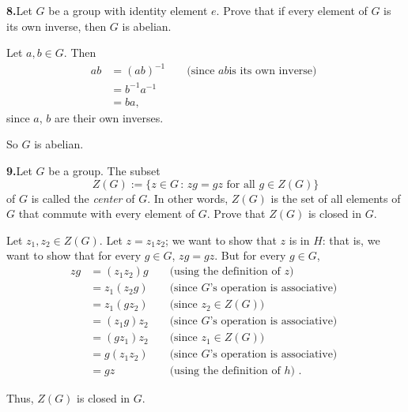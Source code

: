 \documentclass[10pt,]{book}
\theoremstyle{plain}
\theoremstyle{definition}
\theoremstyle{definition}
\theoremstyle{definition}
\theoremstyle{definition}
\numberwithin{equation}{section}
\newcommand{\amp}{&}
\begin{document}
\par\smallskip
\noindent\textbf{8.}\quad{}Let \(G\) be a group with identity element \(e\). Prove that if every element of \(G\) is its own inverse, then \(G\) is abelian.%
\par\smallskip
Let \(a,b\in G\). Then%
%
\begin{align*}
ab\amp =(ab)^{-1}\amp \amp \text{ (since \(ab\)
is its own inverse) }\\
\amp =b^{-1}a^{-1}\amp \amp\\
\amp =ba, \amp
\end{align*}
since \(a\), \(b\) are their own inverses.%
\par
So \(G\) is abelian.%
\par\smallskip
\noindent\textbf{9.}\quad{}Let \(G\) be a group. The subset%
\begin{equation*}
Z(G):=\{z \in G\,:\, zg=gz \mbox{ for all } g\in Z(G)\}
\end{equation*}
of \(G\) is called the \emph{center} of \(G\). In other words, \(Z(G)\) is the set of all elements of \(G\) that commute with every element of \(G\). Prove that \(Z(G)\) is closed in \(G\).%
\par\smallskip
Let \(z_1, z_2\in Z(G)\). Let \(z=z_1z_2\); we want to show that \(z\) is in \(H\): that is, we want to show that for every \(g\in G\), \(zg=gz\). But for every \(g\in G\),%
\begin{align*}
zg\amp =(z_1z_2)g\amp \amp  \text{ (using the definition of \(z\)) }\\
\amp =z_1(z_2g)\amp \amp  \text{ (since \(G\)'s operation is associative) }\\
\amp =z_1(gz_2)\amp \amp  \text{ (since \(z_2\in Z(G)\)) }\\
\amp =(z_1g)z_2 \amp \amp  \text{ (since \(G\)'s operation is associative) }\\
\amp =(gz_1)z_2 \amp \amp  \text{ (since \(z_1\in Z(G)\)) }\\
\amp =g(z_1z_2)\amp \amp   \text{ (since \(G\)'s operation is associative) }\\
\amp =gz \amp \amp  \text{ (using the definition of \(h\)) } .
\end{align*}
%
\par
Thus, \(Z(G)\) is closed in \(G\).%
\par\smallskip
\end{document}
